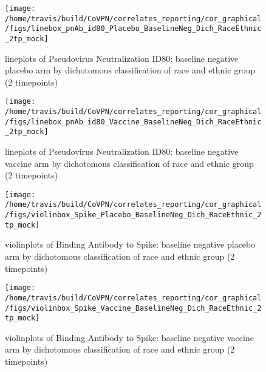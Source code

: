 \documentclass[]{book}
\theoremstyle{definition}
\theoremstyle{definition}
\theoremstyle{definition}
\newcommand{\1}{\mathbbm{1}}
\begin{document}
\clearpage
\begin{figure}[H]

{\centering \texttt{[image: /home/travis/build/CoVPN/correlates\_reporting/cor\_graphical/figs/linebox\_pnAb\_id80\_Placebo\_BaselineNeg\_Dich\_RaceEthnic\_2tp\_mock]} 

}

\caption{lineplots of Pseudovirus Neutralization ID80: baseline negative placebo arm by dichotomous classification of race and ethnic group (2 timepoints)}\label{fig:unnamed-chunk-225}
\end{figure}

\clearpage
\begin{figure}[H]

{\centering \texttt{[image: /home/travis/build/CoVPN/correlates\_reporting/cor\_graphical/figs/linebox\_pnAb\_id80\_Vaccine\_BaselineNeg\_Dich\_RaceEthnic\_2tp\_mock]} 

}

\caption{lineplots of Pseudovirus Neutralization ID80: baseline negative vaccine arm by dichotomous classification of race and ethnic group (2 timepoints)}\label{fig:unnamed-chunk-226}
\end{figure}

\clearpage
\begin{figure}[H]

{\centering \texttt{[image: /home/travis/build/CoVPN/correlates\_reporting/cor\_graphical/figs/violinbox\_Spike\_Placebo\_BaselineNeg\_Dich\_RaceEthnic\_2tp\_mock]} 

}

\caption{violinplots of Binding Antibody to Spike: baseline negative placebo arm by dichotomous classification of race and ethnic group (2 timepoints)}\label{fig:unnamed-chunk-227}
\end{figure}

\clearpage
\begin{figure}[H]

{\centering \texttt{[image: /home/travis/build/CoVPN/correlates\_reporting/cor\_graphical/figs/violinbox\_Spike\_Vaccine\_BaselineNeg\_Dich\_RaceEthnic\_2tp\_mock]} 

}

\caption{violinplots of Binding Antibody to Spike: baseline negative vaccine arm by dichotomous classification of race and ethnic group (2 timepoints)}\label{fig:unnamed-chunk-228}
\end{figure}
\end{document}
